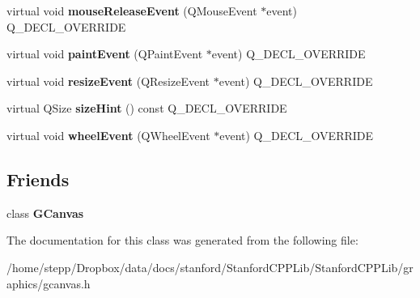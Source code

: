 \begin{DoxyCompactItemize}
virtual void {\bfseries mouse\+Release\+Event} (Q\+Mouse\+Event $\ast$event) Q\+\_\+\+D\+E\+C\+L\+\_\+\+O\+V\+E\+R\+R\+I\+DE
\item 
\mbox{\label{class__Internal__QCanvas_a5ad2744a90706d9e256fed2c0b64f6b8}} 
virtual void {\bfseries paint\+Event} (Q\+Paint\+Event $\ast$event) Q\+\_\+\+D\+E\+C\+L\+\_\+\+O\+V\+E\+R\+R\+I\+DE
\item 
\mbox{\label{class__Internal__QCanvas_aa0e9ce963fc2570d9e14d1294b80cef6}} 
virtual void {\bfseries resize\+Event} (Q\+Resize\+Event $\ast$event) Q\+\_\+\+D\+E\+C\+L\+\_\+\+O\+V\+E\+R\+R\+I\+DE
\item 
\mbox{\label{class__Internal__QCanvas_ad8cab3d5382b001ff9cc152bba77a711}} 
virtual Q\+Size {\bfseries size\+Hint} () const Q\+\_\+\+D\+E\+C\+L\+\_\+\+O\+V\+E\+R\+R\+I\+DE
\item 
\mbox{\label{class__Internal__QCanvas_a72af017da473b4b3e83094c2f5cd8e75}} 
virtual void {\bfseries wheel\+Event} (Q\+Wheel\+Event $\ast$event) Q\+\_\+\+D\+E\+C\+L\+\_\+\+O\+V\+E\+R\+R\+I\+DE
\end{DoxyCompactItemize}
\subsection*{Friends}
\begin{DoxyCompactItemize}
\item 
\mbox{\label{class__Internal__QCanvas_a6574c8670867d0419505dbf9a106d1c7}} 
class {\bfseries G\+Canvas}
\end{DoxyCompactItemize}


The documentation for this class was generated from the following file\+:\begin{DoxyCompactItemize}
\item 
/home/stepp/\+Dropbox/data/docs/stanford/\+Stanford\+C\+P\+P\+Lib/\+Stanford\+C\+P\+P\+Lib/graphics/gcanvas.\+h\end{DoxyCompactItemize}

